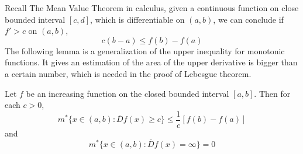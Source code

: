 \documentclass[lang=en, 12pt]{elegantbook}
\begin{document}
        Recall The Mean Value Theorem in calculus, given a continuous function on close bounded interval $[c,d]$, which is differentiable
    on $(a,b)$, we can conclude if $f'> c$ on $(a,b)$, $$c(b-a) \leq f(b) - f(a)$$
        The following lemma is a generalization of the upper inequality for monotonic functions. It gives an estimation of the area 
    of the upper derivative is bigger than a certain number, which is needed in the proof of Lebesgue theorem. 
        \begin{lemma}
            Let $f$ be an increasing function on the closed bounded interval $[a,b]$. Then for each $c>0$, 
            $$m^*\{x \in (a,b) : \overline{D}f(x) \geq c\} \leq \frac{1}{c} [f(b) -f(a)]$$
            and 
            \begin{equation}\label{LemmaUpperDerivativeMeasureEstimationInfty}
                m^*\{x \in (a,b): \overline{D}f(x) = \infty \} = 0                
            \end{equation}
        \end{lemma}
\end{document}
